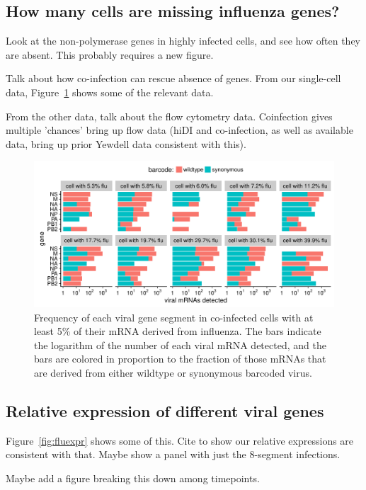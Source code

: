 \documentclass[9pt,lineno]{elife}
\begin{document}
\subsection{How many cells are missing influenza genes?}
Look at the non-polymerase genes in highly infected cells, and see how often they are absent.
This probably requires a new figure.

Talk about how co-infection can rescue absence of genes.
From our single-cell data, Figure~\ref{fig:coexpression} shows some of the relevant data.

From the other data, talk about the flow cytometry data.
Coinfection gives multiple 'chances' bring up flow data (hiDI and co-infection, as well as available data, bring up prior Yewdell data consistent with this).

\begin{figure}
\includegraphics[width=\linewidth]{figures/p_coinfection.pdf}
\caption{
Frequency of each viral gene segment in co-infected cells with at least 5\% of their mRNA derived from influenza.
The bars indicate the logarithm of the number of each viral mRNA detected, and the bars are colored in proportion to the fraction of those mRNAs that are derived from either wildtype or synonymous barcoded virus.
}
\label{fig:coexpression}
\end{figure}

\subsection{Relative expression of different viral genes}
Figure~\ref{fig:fluexpr} shows some of this.
Cite \citet{hatada1989control} to show our relative expressions are consistent with that.
Maybe show a panel with just the 8-segment infections.

Maybe add a figure breaking this down among timepoints.
\end{document}
